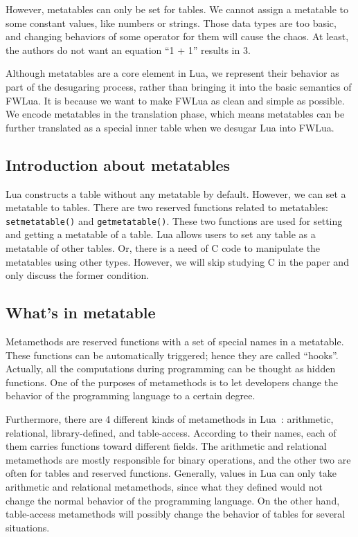 However, metatables can only be set for tables. We cannot assign a metatable to some constant values, like numbers or strings. Those data types are too basic, and changing behaviors of some operator for them will cause the chaos. At least, the authors do not want an equation ``1 + 1'' results in 3. 

Although metatables are a core element in Lua, we represent their behavior as part of the desugaring process, rather than bringing it into the basic semantics of FWLua.
It is because we want to make FWLua as clean and simple as possible.
We encode metatables in the translation phase, which means metatables can be further translated as a special inner table when we desugar Lua into FWLua.

\subsection{Introduction about metatables}
Lua constructs a table without any metatable by default.
However, we can set a metatable to tables.
There are two reserved functions related to metatables: {\tt setmetatable()} and {\tt getmetatable()}. These two functions are used for setting and getting a metatable of a table. 
Lua allows users to set any table as a metatable of other tables. Or, there is a need of C code to manipulate the metatables using other types. However, we will skip studying C in the paper and only discuss the former condition.

\subsection{What's in metatable}
Metamethods are reserved functions with a set of special names in a metatable. These functions can be automatically triggered; hence they are called ``hooks''. Actually, all the computations during programming can be thought as hidden functions. One of the purposes of metamethods is to let developers change the behavior of the programming language to a certain degree.

Furthermore, there are 4 different kinds of metamethods in Lua~\cite{PIL}: arithmetic, relational, library-defined, and table-access. According to their names, each of them carries functions toward different fields. The arithmetic and relational metamethods are mostly responsible for binary operations, and the other two are often for tables and reserved functions. Generally, values in Lua can only take arithmetic and relational metamethods, since what they defined would not change the normal behavior of the programming language. On the other hand, table-access metamethods will possibly change the behavior of tables for several situations.

